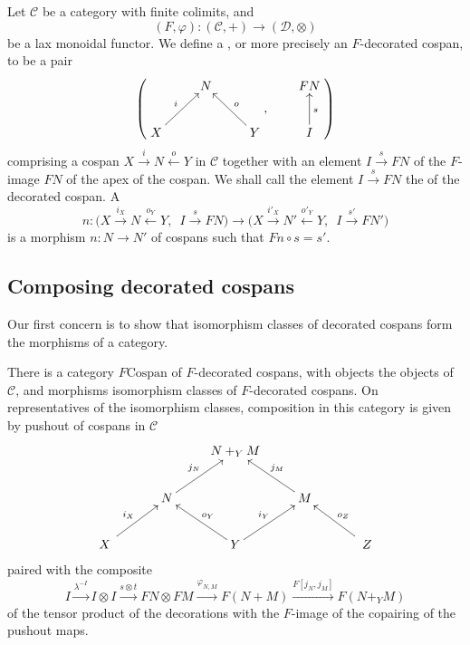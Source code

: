 \begin{definition} \label{def:fcospans}
  Let $\mathcal C$ be a category with finite colimits, and
  \[
    (F,\varphi)\colon  (\mathcal C,+) \longrightarrow (\mathcal D, \otimes)
  \]
  be a lax monoidal functor. We define a , or more
  precisely an $F$-decorated cospan, to be a pair 
  \[
    \left(
    \begin{aligned}
      \xymatrix{
	& N \\  
	X \ar[ur]^{i} && Y \ar[ul]_{o}
      }
    \end{aligned}
    ,
    \qquad
    \begin{aligned}
      \xymatrix{
	FN \\
	I \ar[u]_{s}
      }
    \end{aligned}
    \right)
  \]
  comprising a cospan $X \stackrel{i}\rightarrow N \stackrel{o}\leftarrow Y$ in
  $\mathcal C$ together with an element $I \stackrel{s}\rightarrow FN$ of
  the $F$-image $FN$ of the apex of the cospan. We shall call the element $I
  \stackrel{s}\rightarrow FN$ the  of the decorated
  cospan. A 
  \[
    n\colon  \big(X \stackrel{i_X}\longrightarrow N \stackrel{o_Y}\longleftarrow
    Y,\enspace I \stackrel{s}\longrightarrow FN\big) \longrightarrow \big(X
    \stackrel{i'_X}\longrightarrow N' \stackrel{o'_Y}\longleftarrow Y,\enspace I
    \stackrel{s'}\longrightarrow FN'\big)
  \]
  is a morphism $n\colon  N \to N'$ of cospans such that $Fn \circ s = s'$.
\end{definition}

\subsection{Composing decorated cospans}

Our first concern is to show that isomorphism classes of decorated cospans form
the morphisms of a category.

\begin{proposition} \label{prop.composingdeccospans}
  There is a category $F\mathrm{Cospan}$ of $F$-decorated cospans, with objects
  the objects of $\mathcal C$, and morphisms isomorphism classes of
  $F$-decorated cospans. On representatives of the isomorphism classes,
  composition in this category is given by pushout of cospans in $\mathcal C$
  \[
    \xymatrix{
      && N+_YM \\
      & N \ar[ur]^{j_N} && M \ar[ul]_{j_M} \\
      \quad X \quad \ar[ur]^{i_X} && Y \ar[ul]_{o_Y} \ar[ur]^{i_Y} && \quad Z
      \quad \ar[ul]_{o_Z}
    }
  \]
  paired with the composite
  \[
    I \stackrel{\lambda^{-I}}\longrightarrow I \otimes I \stackrel{s \otimes
    t}\longrightarrow FN \otimes FM \stackrel{\varphi_{N,M}}\longrightarrow
    F(N+M) \stackrel{F[j_N,j_M]}\longrightarrow F(N+_YM)
  \]
  of the tensor product of the decorations with the $F$-image of the copairing
  of the pushout maps.
\end{proposition}


